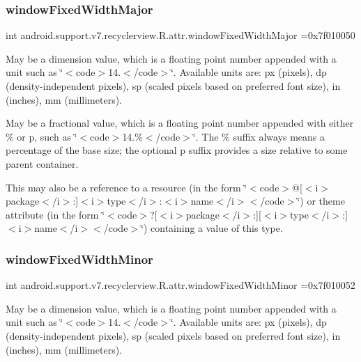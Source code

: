 \subsubsection{\texorpdfstring{window\+Fixed\+Width\+Major}{windowFixedWidthMajor}}
{\footnotesize\ttfamily int android.\+support.\+v7.\+recyclerview.\+R.\+attr.\+window\+Fixed\+Width\+Major =0x7f010050\hspace{0.3cm}{\ttfamily [static]}}

May be a dimension value, which is a floating point number appended with a unit such as \char`\"{}$<$code$>$14.\+5sp$<$/code$>$\char`\"{}. Available units are\+: px (pixels), dp (density-\/independent pixels), sp (scaled pixels based on preferred font size), in (inches), mm (millimeters). 

May be a fractional value, which is a floating point number appended with either \% or p, such as \char`\"{}$<$code$>$14.\%$<$/code$>$\char`\"{}. The \% suffix always means a percentage of the base size; the optional p suffix provides a size relative to some parent container. 

This may also be a reference to a resource (in the form \char`\"{}$<$code$>$@\mbox{[}$<$i$>$package$<$/i$>$\+:\mbox{]}$<$i$>$type$<$/i$>$\+:$<$i$>$name$<$/i$>$$<$/code$>$\char`\"{}) or theme attribute (in the form \char`\"{}$<$code$>$?\mbox{[}$<$i$>$package$<$/i$>$\+:\mbox{]}\mbox{[}$<$i$>$type$<$/i$>$\+:\mbox{]}$<$i$>$name$<$/i$>$$<$/code$>$\char`\"{}) containing a value of this type. \mbox{\label{classandroid_1_1support_1_1v7_1_1recyclerview_1_1R_1_1attr_a81a2e241e22776f9fc760d2d2862b7cc}} 
\subsubsection{\texorpdfstring{window\+Fixed\+Width\+Minor}{windowFixedWidthMinor}}
{\footnotesize\ttfamily int android.\+support.\+v7.\+recyclerview.\+R.\+attr.\+window\+Fixed\+Width\+Minor =0x7f010052\hspace{0.3cm}{\ttfamily [static]}}

May be a dimension value, which is a floating point number appended with a unit such as \char`\"{}$<$code$>$14.\+5sp$<$/code$>$\char`\"{}. Available units are\+: px (pixels), dp (density-\/independent pixels), sp (scaled pixels based on preferred font size), in (inches), mm (millimeters). 

